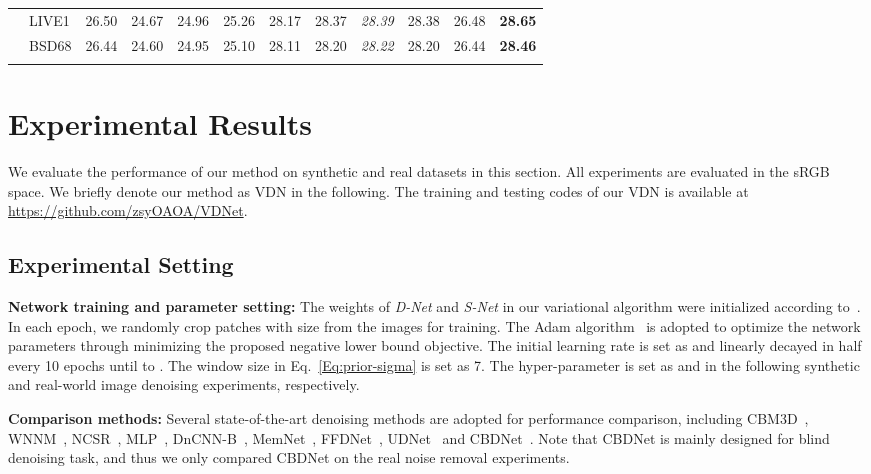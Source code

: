 \documentclass{article}
\begin{document}
\begin{table}[t]
\begin{tabular}{@{}C{1.0cm}@{}|@{}C{1.2cm}@{}|@{}C{1.1cm}@{}@{}C{1.1cm}@{}@{}C{1.1cm}@{}
        @{}C{1.0cm}@{}@{}C{1.0cm}@{}@{}C{1.5cm}@{}@{}C{1.3cm}@{}@{}C{1.3cm}@{}@{}C{1.1cm}@{}@{}C{1.2cm}@{}}
        &  LIVE1    & 26.50 &24.67   &24.96  &25.26  &28.17     & 28.37   &\textit{28.39}  &28.38  &26.48  &\textbf{28.65}   \\
        &  BSD68    & 26.44 &24.60   &24.95  &25.10  &28.11     & 28.20   &\textit{28.22}  &28.20  &26.44  &\textbf{28.46}   \\
        \Xhline{0.8pt}
    \end{tabular}
    \label{tab:psnr_noniid}
    \vspace{-2mm}
\end{table}

\vspace{-2mm}\section{Experimental Results}\vspace{-2mm}
We evaluate the performance of our method on synthetic and real datasets in this section. All experiments
are evaluated in the sRGB space. We briefly denote our method as VDN in the following. The training and
testing codes of our VDN is available at \url{https://github.com/zsyOAOA/VDNet}.

\vspace{-2mm}\subsection{Experimental Setting}\vspace{-2mm}
\textbf{Network training and parameter setting:} The weights of \textit{D-Net} and \textit{S-Net} in our variational
algorithm were initialized according to~\cite{he2015delving}. In each epoch, we randomly crop  patches
with size  from the images for training. The Adam algorithm~\cite{Kingma2015} is adopted to
optimize the network parameters through minimizing the proposed negative lower bound objective. The initial learning
rate is set as  and linearly decayed in half every 10 epochs until to .
The window size  in Eq.~\eqref{Eq:prior-sigma} is set as 7. The hyper-parameter  is set as
 and  in the following synthetic and real-world image denoising experiments, respectively.

\textbf{Comparison methods:} Several state-of-the-art denoising methods are adopted for performance comparison,
including CBM3D~\cite{4271520}, WNNM~\cite{gu2014weighted}, NCSR~\cite{dong2012nonlocally}, MLP~\cite{burger2012image},
DnCNN-B~\cite{zhang2017beyond}, MemNet~\cite{tai2017memnet}, FFDNet~\cite{zhang2018ffdnet}, UDNet~\cite{lefkimmiatis2018universal}
and CBDNet~\cite{guo2018toward}. Note that CBDNet is mainly designed for blind denoising task, and thus we only
compared CBDNet on the real noise removal experiments.
\end{document}
